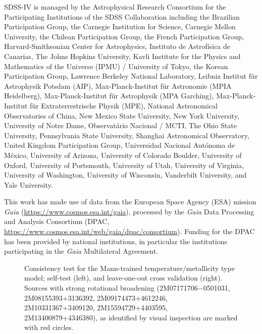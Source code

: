 \documentclass[modern]{aastex62}
\begin{document}
SDSS-IV is managed by the Astrophysical Research Consortium for the 
Participating Institutions of the SDSS Collaboration including the 
Brazilian Participation Group, the Carnegie Institution for Science, 
Carnegie Mellon University, the Chilean Participation Group, the French Participation Group, Harvard-Smithsonian Center for Astrophysics, 
Instituto de Astrof\'isica de Canarias, The Johns Hopkins University, 
Kavli Institute for the Physics and Mathematics of the Universe (IPMU) / 
University of Tokyo, the Korean Participation Group, Lawrence Berkeley National Laboratory, 
Leibniz Institut f\"ur Astrophysik Potsdam (AIP),  
Max-Planck-Institut f\"ur Astronomie (MPIA Heidelberg), 
Max-Planck-Institut f\"ur Astrophysik (MPA Garching), 
Max-Planck-Institut f\"ur Extraterrestrische Physik (MPE), 
National Astronomical Observatories of China, New Mexico State University, 
New York University, University of Notre Dame, 
Observat\'ario Nacional / MCTI, The Ohio State University, 
Pennsylvania State University, Shanghai Astronomical Observatory, 
United Kingdom Participation Group,
Universidad Nacional Aut\'onoma de M\'exico, University of Arizona, 
University of Colorado Boulder, University of Oxford, University of Portsmouth, 
University of Utah, University of Virginia, University of Washington, University of Wisconsin, 
Vanderbilt University, and Yale University.

This work has made use of data from the European Space Agency (ESA) mission
{\it Gaia} (\url{https://www.cosmos.esa.int/gaia}), processed by the {\it Gaia}
Data Processing and Analysis Consortium (DPAC,
\url{https://www.cosmos.esa.int/web/gaia/dpac/consortium}). Funding for the DPAC
has been provided by national institutions, in particular the institutions
participating in the {\it Gaia} Multilateral Agreement.

\color{gcolor}{HOGG: grants etc}\color{black} 

\color{gcolor}{ADAM: grants etc, FAST acknowledgement?}\color{black}


\newpage

\begin{figure}[ht]
\caption{Consistency test for the Mann-trained temperature/metallicity type model; self-test (left), and leave-one-out cross validation (right). Sources with strong rotational broadening (2M07171706−0501031, 2M08155393+3136392, 2M09174473+4612246, 2M10331367+3409120, 2M15594729+4403595, 2M13400879+4346380), as identified by visual inspection are marked with red circles.} \label{fig:mann_validation}
\end{figure}
\end{document}
